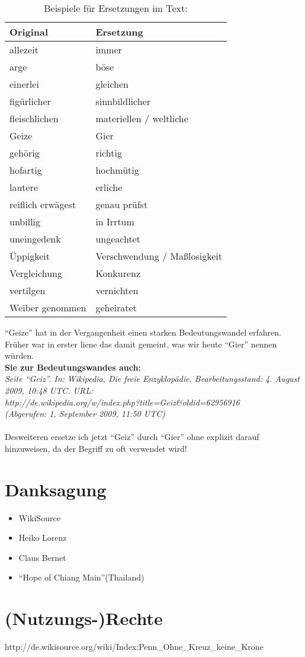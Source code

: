 \begin{table} \centering
\caption{Beispiele für Ersetzungen im Text:}
\begin{tabular}{|l|l|} \hline
\textbf{Original} 	& \textbf{Ersetzung} 		\\ \hline \hline
allezeit 		& immer  			\\ \hline
arge 			& böse  			\\ \hline
einerlei 		& gleichen 	 		\\ \hline
figürlicher 		& sinnbildlicher  		\\ \hline
fleischlichen  		& materiellen / weltliche  	\\ \hline
Geize			& Gier\\ \hline
gehörig 		& richtig			\\ \hline
hofartig 		& hochmütig			\\ \hline
lautere 		& erliche   			\\ \hline
reiflich erwägest 	& genau prüfst 			\\ \hline
unbillig       		& in Irrtum  			\\ \hline
uneingedenk 		& ungeachtet			\\ \hline
Üppigkeit 		& Verschwendung / Maßlosigkeit		\\ \hline
Vergleichung 		& Konkurenz  			\\ \hline
vertilgen 		& vernichten			\\ \hline
Weiber genommen 	& geheiratet  			\\ \hline
 
\end{tabular} 

\end{table}
"`Geize"' hat in der Vergangenheit einen starken Bedeutungswandel erfahren. Früher war in erster liene das damit gemeint, was wir heute "`Gier"' nennen würden.
\\ \textbf{Sie zur Bedeutungswandes auch:}
\\ \textit{Seite "`Geiz"'. In: Wikipedia, Die freie Enzyklopädie. Bearbeitungsstand: 4. August 2009, 10:48 UTC. URL:
\\ http://de.wikipedia.org/w/index.php?title=Geiz\&oldid=62956916
\\ (Abgerufen: 1. September 2009, 11:50 UTC) }
\\ \\ Desweiteren ersetze ich jetzt "`Geiz"' durch "`Gier"' ohne explizit darauf hinzuweisen, da der Begriff zu oft verwendet wird!
	


\chapter{Danksagung}

\begin{itemize}
 \item WikiSource
 \item Heiko Lorenz
 \item Claus Bernet
 \item "`Hope of Chiang Main"'(Thailand)
\end{itemize}


\chapter{(Nutzungs-)Rechte}
http://de.wikisource.org/wiki/Index:Penn\_Ohne\_Kreuz\_keine\_Krone
